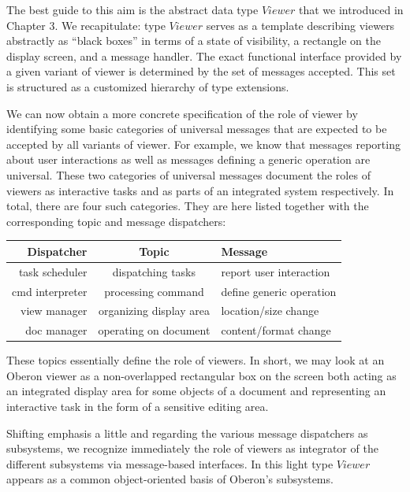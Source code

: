 The best guide to this aim is the abstract data type $Viewer$ that we introduced in Chapter 3. We
recapitulate: type $Viewer$ serves as a template describing viewers abstractly as “black boxes” in
terms of a state of visibility, a rectangle on the display screen, and a message handler. The exact
functional interface provided by a given variant of viewer is determined by the set of messages
accepted. This set is structured as a customized hierarchy of type extensions.

We can now obtain a more concrete specification of the role of viewer by identifying some basic
categories of universal messages that are expected to be accepted by all variants of viewer. For
example, we know that messages reporting about user interactions as well as messages defining
a generic operation are universal. These two categories of universal messages document the
roles of viewers as interactive tasks and as parts of an integrated system respectively.
In total, there are four such categories. They are here listed together with the corresponding topic and message dispatchers:
\begin{table}[h!]
	\setlength{\tabcolsep}{1pt}
	\begin{tabular}{r|c|l}
		Dispatcher               &Topic
		                         &Message \\\hline
		{\small task scheduler } &{\small dispatching tasks       }
		                         &{\small report user interaction }\\
		{\small cmd interpreter} &{\small processing command      }
		                         &{\small define generic operation}\\
		{\small view manager   } &{\small organizing display area }
		                         &{\small location/size change    }\\
		{\small doc manager    } &{\small operating on document   }
		                         &{\small content/format change   }
	\end{tabular}
\end{table}
These topics essentially define the role of viewers. In short, we may look at an Oberon viewer as a non-overlapped rectangular box on the screen both acting as an integrated display area for some objects of a document and representing an interactive task in the form of a sensitive
editing area.

Shifting emphasis a little and regarding the various message dispatchers as subsystems, we
recognize immediately the role of viewers as integrator of the different subsystems via message-based interfaces. In this light type $Viewer$ appears as a common object-oriented basis of Oberon's
subsystems.

